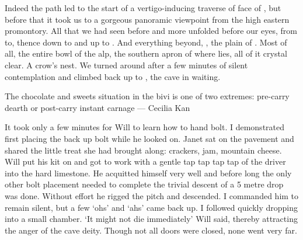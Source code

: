 Indeed the path led to the start of a vertigo-inducing traverse of face of , but before that it took us to a gorgeous panoramic viewpoint from the high eastern promontory. All that we had seen before and more unfolded before our eyes, from  to, thence down to  and up to . And everything beyond, , the plain of . Most of all, the entire bowl of the  alp, the southern apron of  where  lies, all of it crystal clear. A crow’s nest. We turned around after a few minutes of silent contemplation and climbed back up to , the cave in waiting. 

\begin{marginfigure}
\centering
{}
\label{chocolate}
\caption{The chocolate and sweets situation in the bivi is one of two extremes: pre-carry dearth or post-carry instant carnage --- Cecilia Kan}
\end{marginfigure}

It took only a few minutes for Will to learn how to hand bolt. I demonstrated first placing the back up bolt while he looked on. Janet sat on the pavement and shared the little treat she had brought along: crackers, jam, mountain cheese. Will put his kit on and got to work with a gentle tap tap tap tap  of the driver into the hard limestone. He acquitted himself very well and before long the only other bolt placement needed to complete the trivial descent of a 5 metre drop was done. Without effort he rigged the pitch and descended. I commanded him to remain silent, but a few ‘ohs’ and ‘ahs’ came back up. I followed quickly dropping into a small chamber.
‘It might not die immediately’ Will said, thereby attracting the anger of the cave deity. Though not all doors were closed, none went very far. 




